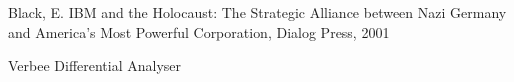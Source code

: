 \documentclass[
12pt,		%
openright,	%
twoside,  %
a4paper,			%
chapter=TITLE,		%
english,			%
french,				%
spanish,			%
brazil				%
]{USPSC-classe/USPSC}
\begin{document}
\begin{flushleft}
\begin{flushleft}
\begin{flushleft}
\begin{flushleft}
\begin{flushleft}
\begin{flushleft}
\begin{flushleft}
\begin{flushleft}
\begin{flushleft}
\begin{flushleft}
[BLACK, 2001] Black, E. IBM and the Holocaust: The Strategic Alliance between Nazi Germany and America's Most Powerful Corporation, Dialog Press, 2001
\end{flushleft}


\end{flushleft}


\end{flushleft}


\end{flushleft}


\end{flushleft}


\end{flushleft}


\end{flushleft}


\end{flushleft}


\end{flushleft}


\end{flushleft}


\begin{flushleft}
\begin{flushleft}
\begin{flushleft}
\begin{flushleft}
\begin{flushleft}
\begin{flushleft}
\begin{flushleft}
\begin{flushleft}
\begin{flushleft}
\begin{flushleft}
[BRITANNICA, 2022] Verbee Differential Analyser
\end{flushleft}


\end{flushleft}


\end{flushleft}


\end{flushleft}


\end{flushleft}


\end{flushleft}


\end{flushleft}


\end{flushleft}


\end{flushleft}


\end{flushleft}
\end{document}
